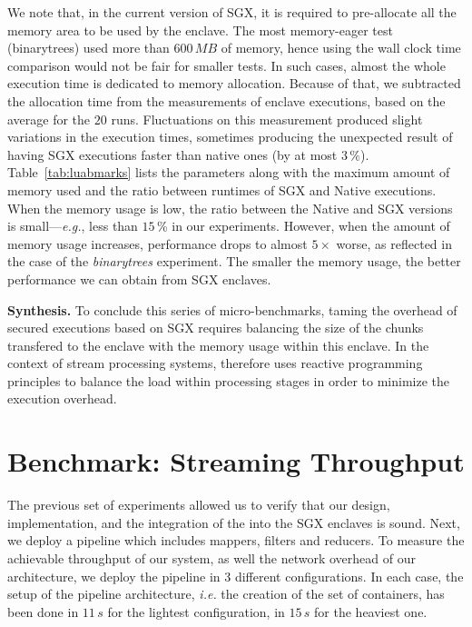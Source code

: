 We note that, in the current version of SGX, it is required to pre-allocate all the memory area to be used by the enclave.
The most memory-eager test (\textsf{binarytrees}) used more than $600\,\mathit{MB}$ of memory, hence using the wall clock time comparison would not be fair for smaller tests.
In such cases, almost the whole execution time is dedicated to memory allocation.
Because of that, we subtracted the allocation time from the measurements of enclave executions, based on the average for the $20$ runs.
Fluctuations on this measurement produced slight variations in the execution times, sometimes producing the unexpected result of having SGX executions faster than native ones (by at most $3\,\%$).
Table~\ref{tab:luabmarks} lists the parameters along with the maximum amount of memory used and the ratio between runtimes of SGX and Native executions.
When the memory usage is low, the ratio between the Native and SGX versions is small---\textit{e.g.}, less than $15$\,\% in our experiments.
However, when the amount of memory usage increases, performance drops to almost $5\times$ worse, as reflected in the case of the \emph{binarytrees} experiment.
The smaller the memory usage, the better performance we can obtain from SGX enclaves.

\vspace{10pt}\noindent\textbf{Synthesis.}
To conclude this series of micro-benchmarks, taming the overhead of secured executions based on SGX requires balancing the size of the chunks transfered to the enclave with the memory usage within this enclave.
In the context of stream processing systems, \SS{} therefore uses reactive programming principles to balance the load within processing stages in order to minimize the execution overhead.


\section{Benchmark: Streaming Throughput}

The previous set of experiments allowed us to verify that our design, implementation, and the integration of the \luavm into the SGX enclaves is sound.
Next, we deploy a \SS{} pipeline which includes mappers, filters and reducers.
To measure the achievable throughput of our system, as well the network overhead of our architecture, we deploy the \SS{} pipeline in 3 different configurations.
In each case, the setup of the pipeline architecture, \emph{i.e.} the creation of the set of containers, has been done in $11\,\mathit{s}$ for the lightest configuration, in $15\,\mathit{s}$ for the heaviest one.

